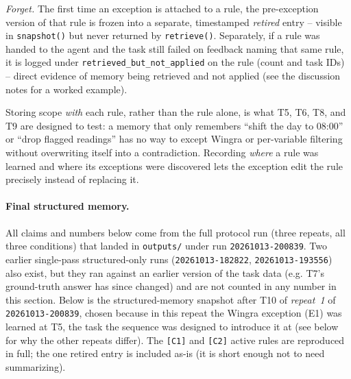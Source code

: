 \emph{Forget.} The first time an exception is attached to a rule, the pre-exception version
of that rule is frozen into a separate, timestamped \emph{retired} entry -- visible in
\texttt{snapshot()} but never returned by \texttt{retrieve()}. Separately, if a rule was handed
to the agent and the task still failed on feedback naming that same rule, it is logged under
\texttt{retrieved\_but\_not\_applied} on the rule (count and task IDs) -- direct evidence of
memory being retrieved and not applied (see the discussion notes for a worked example).

Storing scope \emph{with} each rule, rather than the rule alone, is what T5, T6, T8, and T9 are
designed to test: a memory that only remembers ``shift the day to 08:00'' or ``drop flagged
readings'' has no way to except Wingra or per-variable filtering without overwriting itself
into a contradiction. Recording \emph{where} a rule was learned and where its exceptions were
discovered lets the exception edit the rule precisely instead of replacing it.

\paragraph{Final structured memory.} All claims and numbers below come from the full protocol
run (three repeats, all three conditions) that landed in \texttt{outputs/} under run
\texttt{20261013-200839}. Two earlier single-pass structured-only runs
(\texttt{20261013-182822}, \texttt{20261013-193556}) also exist, but they ran against an
earlier version of the task data (e.g. T7's ground-truth answer has since changed) and are not
counted in any number in this section. Below is the structured-memory snapshot after T10 of
\emph{repeat~1} of \texttt{20261013-200839}, chosen because in this repeat the Wingra exception
(E1) was learned at T5, the task the sequence was designed to introduce it at (see below for
why the other repeats differ). The \texttt{[C1]} and \texttt{[C2]} active rules are reproduced
in full; the one retired entry is included as-is (it is short enough not to need summarizing).

